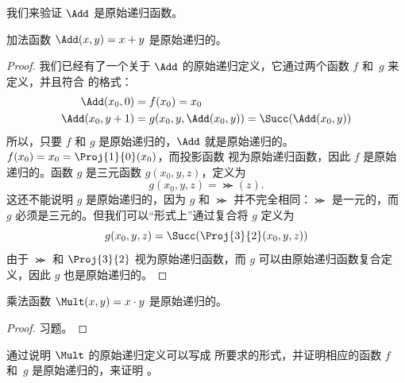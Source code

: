 \documentclass[../../../include/open-logic-section]{subfiles}
\begin{document}
我们来验证 $\Add$ 是原始递归函数。

\begin{prop}
  加法函数 $\Add(x,y) = x+y$ 是原始递归的。
\end{prop}

\begin{proof}
我们已经有了一个关于 $\Add$ 的原始递归定义，它通过两个函数 $f$ 和~$g$ 来定义，并且符合
 的格式：
\begin{align*}
  \Add(x_0, 0) & = f(x_0) = x_0\\
  \Add(x_0, y+1) & = g(x_0, y, \Add(x_0, y)) =
  \Succ(\Add(x_0, y))
\end{align*}
所以，只要 $f$ 和 $g$ 是原始递归的，$\Add$ 就是原始递归的。$f(x_0) = x_0 = \Proj{1}{0}(x_0)$，而投影函数
视为原始递归函数，因此 $f$ 是原始递归的。函数 $g$ 是三元函数 $g(x_0, y, z)$，定义为
\[
g(x_0, y, z) = \Succ(z).
\]
这还不能说明 $g$ 是原始递归的，因为 $g$ 和 $\Succ$ 并不完全相同：$\Succ$ 是一元的，而 $g$ 必须是三元的。但我们可以“形式上”通过复合将 $g$ 定义为
\[
g(x_0, y, z) = \Succ(\Proj{3}{2}(x_0, y, z))
\]
由于 $\Succ$ 和 $\Proj{3}{2}$ 视为原始递归函数，而 $g$ 可以由原始递归函数复合定义，因此 $g$ 也是原始递归的。
\end{proof}

\begin{prop}
  乘法函数 $\Mult(x,y) = x \cdot y$ 是原始递归的。
\end{prop}

\begin{proof}
  习题。
\end{proof}

\begin{prob}
  通过说明 $\Mult$ 的原始递归定义可以写成  所要求的形式，并证明相应的函数 $f$ 和~$g$ 是原始递归的，来证明 。
\end{prob}
\end{document}
